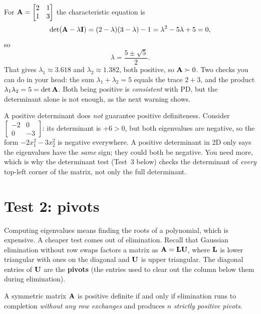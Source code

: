 \begin{example}
\label{ch27:ex-eig}
For $\mathbf{A} = \begin{bmatrix} 2 & 1 \\ 1 & 3 \end{bmatrix}$ the characteristic equation is
\[
  \det(\mathbf{A} - \lambda\mathbf{I}) = (2-\lambda)(3-\lambda) - 1 = \lambda^2 - 5\lambda + 5 = 0,
\]
so
\[
  \lambda = \frac{5 \pm \sqrt 5}{2}.
\]
That gives $\lambda_1 \approx 3.618$ and $\lambda_2 \approx 1.382$, both positive, so $\mathbf{A}\succ
0$. Two checks you can do in your head: the sum $\lambda_1 + \lambda_2 = 5$ equals the trace $2+3$,
and the product $\lambda_1\lambda_2 = 5 = \det\mathbf{A}$. Both being positive is \emph{consistent}
with PD, but the determinant alone is not enough, as the next warning shows.
\end{example}

\begin{trapbox}
A positive determinant does \emph{not} guarantee positive definiteness. Consider
$\begin{bmatrix} -2 & 0 \\ 0 & -3 \end{bmatrix}$: its determinant is $+6 > 0$, but both eigenvalues
are negative, so the form $-2x_1^2 - 3x_2^2$ is negative everywhere. A positive determinant in 2D
only says the eigenvalues have the \emph{same} sign; they could both be negative. You need more,
which is why the determinant test (Test~3 below) checks the determinant of \emph{every} top-left
corner of the matrix, not only the full determinant.
\end{trapbox}

\section{Test 2: pivots}

Computing eigenvalues means finding the roots of a polynomial, which is expensive. A cheaper test
comes out of elimination. Recall that Gaussian elimination without row swaps factors a matrix as
$\mathbf{A} = \mathbf{L}\mathbf{U}$, where $\mathbf{L}$ is lower triangular with ones on the diagonal and
$\mathbf{U}$ is upper triangular. The diagonal entries of $\mathbf{U}$ are the \textbf{pivots} (the
entries used to clear out the column below them during elimination).

\begin{theorem}
\label{ch27:thm-pivots}
A symmetric matrix $\mathbf{A}$ is positive definite if and only if elimination runs to completion
\emph{without any row exchanges} and produces $n$ \emph{strictly positive pivots}.
\end{theorem}

